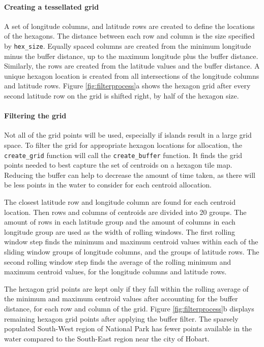 \hypertarget{creating-a-tessellated-grid}{%
\paragraph{Creating a tessellated
grid}\label{creating-a-tessellated-grid}}

A set of longitude columns, and latitude rows are created to define the
locations of the hexagons. The distance between each row and column is
the size specified by \texttt{hex\_size}. Equally spaced columns are
created from the minimum longitude minus the buffer distance, up to the
maximum longitude plus the buffer distance. Similarly, the rows are
created from the latitude values and the buffer distance. A unique
hexagon location is created from all intersections of the longitude
columns and latitude rows. Figure \ref{fig:filterprocess}a shows the
hexagon grid after every second latitude row on the grid is shifted
right, by half of the hexagon size.

\hypertarget{filtering-the-grid}{%
\paragraph{Filtering the grid}\label{filtering-the-grid}}

Not all of the grid points will be used, especially if islands result in
a large grid space. To filter the grid for appropriate hexagon locations
for allocation, the \texttt{create\_grid} function will call the
\texttt{create\_buffer} function. It finds the grid points needed to
best capture the set of centroids on a hexagon tile map. Reducing the
buffer can help to decrease the amount of time taken, as there will be
less points in the water to consider for each centroid allocation.

The closest latitude row and longitude column are found for each
centroid location. Then rows and columns of centroids are divided into
20 groups. The amount of rows in each latitude group and the amount of
columns in each longitude group are used as the width of rolling
windows. The first rolling window step finds the minimum and maximum
centroid values within each of the sliding window groups of longitude
columns, and the groups of latitude rows. The second rolling window step
finds the average of the rolling minimum and maximum centroid values,
for the longitude columns and latitude rows.

The hexagon grid points are kept only if they fall within the rolling
average of the minimum and maximum centroid values after accounting for
the buffer distance, for each row and column of the grid. Figure
\ref{fig:filterprocess}b displays remaining hexagon grid points after
applying the buffer filter. The sparsely populated South-West region of
National Park has fewer points available in the water compared to the
South-East region near the city of Hobart.

